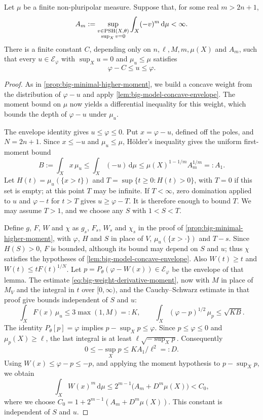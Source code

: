 \begin{proposition}\label{prop:big-model-moment-bound}
Let $\mu$ be a finite non-pluripolar measure. Suppose that, for some real $m>2n+1$,
\[
 A_m:=\sup_{\substack{v\in\mathrm{PSH}(X,\theta)\\\sup_Xv=0}}
             \int_X(-v)^m\,\mathrm{d}\mu<\infty.
\]
There is a finite constant $C$, depending only on
$n,\ell,M,m,\mu(X)$ and $A_m$, such that every $u\in\mathcal E_\varphi$ with $\sup_Xu=0$ and $\mu_u\leq\mu$ satisfies
\[
 \varphi-C\leq u\leq\varphi.
\]
\end{proposition}
\begin{proof}
As in \cref{prop:big-minimal-higher-moment}, we build a concave weight from the distribution of $\varphi-u$ and apply \cref{lem:big-model-concave-envelope}. The moment bound on $\mu$ now yields a differential inequality for this weight, which bounds the depth of $\varphi-u$ under $\mu_u$.

The envelope identity gives $u\leq\varphi\leq0$. Put $x=\varphi-u$, defined off the poles, and $N=2n+1$. Since $x\leq-u$ and $\mu_u\leq\mu$, H\"older's inequality gives the uniform first-moment bound
\[
 B:=\int_Xx\,\mu_u
 \leq\int_X(-u)\,\mathrm{d}\mu
 \leq\mu(X)^{1-1/m}A_m^{1/m}=:A_1.
\]
Let $H(t)=\mu_u(\{x>t\})$ and
$T=\sup\{t\geq0:H(t)>0\}$, with $T=0$ if this set is empty; at this point $T$ may be infinite. If $T<\infty$, zero domination applied to $u$ and $\varphi-t$ for $t>T$ gives $u\geq\varphi-T$. It is therefore enough to bound $T$. We may assume $T>1$, and we choose any $S$ with $1<S<T$.

Define $g$, $F$, $W$ and $\chi$ as $g_s$, $F_s$, $W_s$ and $\chi_s$ in the proof of \cref{prop:big-minimal-higher-moment}, with $\varphi$, $H$ and $S$ in place of $V$, $\mu_u(\{x>\cdot\})$ and $T-s$. Since $H(S)>0$, $F$ is bounded, although its bound may depend on $S$ and $u$; thus $\chi$ satisfies the hypotheses of \cref{lem:big-model-concave-envelope}. Also $W(t)\geq t$ and $W(t)\leq tF(t)^{1/N}$. Let $p=P_\theta(\varphi-W(x))\in\mathcal E_\varphi$ be the envelope of that lemma. The estimate \eqref{eq:big-weight-derivative-moment}, now with $M$ in place of $M_V$ and the integral in $t$ over $[0,\infty)$, and the Cauchy--Schwarz estimate in that proof give bounds independent of $S$ and $u$:
\[
 \int_X F(x)\,\mu_u\leq3\max(1,M)=:K,
 \qquad
 \int_X(\varphi-p)^{1/2}\,\mu_p\leq\sqrt{KB}.
\]
The identity $P_\theta[p]=\varphi$ implies $p-\sup_Xp\leq\varphi$. Since $p\leq\varphi\leq0$ and $\mu_p(X)\geq\ell$, the last integral is at least $\ell\sqrt{-\sup_Xp}$. Consequently
\[
 0\leq-\sup_Xp\leq KA_1/\ell^2=:D.
\]
Using $W(x)\leq\varphi-p\leq-p$, and applying the moment hypothesis to $p-\sup_Xp$, we obtain
\begin{equation}\label{eq:big-model-weight-moment}
 \int_XW(x)^m\,\mathrm{d}\mu
 \leq2^{m-1}\bigl(A_m+D^m\mu(X)\bigr)<C_0,
\end{equation}
where we choose $C_0=1+2^{m-1}(A_m+D^m\mu(X))$. This constant is independent of $S$ and $u$.


\end{proof}
